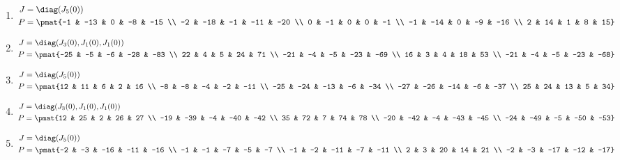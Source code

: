 \begin{enumerate}
\item

\begin{align*}
J &= \diag(J_{5}(0))\\
P &= \pmat{-1 & -13 & 0 & -8 & -15 \\ -2 & -18 & -1 & -11 & -20 \\ 0 & -1 & 0 & 0 & -1 \\ -1 & -14 & 0 & -9 & -16 \\ 2 & 14 & 1 & 8 & 15}
\end{align*}

\item

\begin{align*}
J &= \diag(J_{3}(0), J_{1}(0), J_{1}(0))\\
P &= \pmat{-25 & -5 & -6 & -28 & -83 \\ 22 & 4 & 5 & 24 & 71 \\ -21 & -4 & -5 & -23 & -69 \\ 16 & 3 & 4 & 18 & 53 \\ -21 & -4 & -5 & -23 & -68}
\end{align*}

\item

\begin{align*}
J &= \diag(J_{5}(0))\\
P &= \pmat{12 & 11 & 6 & 2 & 16 \\ -8 & -8 & -4 & -2 & -11 \\ -25 & -24 & -13 & -6 & -34 \\ -27 & -26 & -14 & -6 & -37 \\ 25 & 24 & 13 & 5 & 34}
\end{align*}

\item

\begin{align*}
J &= \diag(J_{3}(0), J_{1}(0), J_{1}(0))\\
P &= \pmat{12 & 25 & 2 & 26 & 27 \\ -19 & -39 & -4 & -40 & -42 \\ 35 & 72 & 7 & 74 & 78 \\ -20 & -42 & -4 & -43 & -45 \\ -24 & -49 & -5 & -50 & -53}
\end{align*}

\item

\begin{align*}
J &= \diag(J_{5}(0))\\
P &= \pmat{-2 & -3 & -16 & -11 & -16 \\ -1 & -1 & -7 & -5 & -7 \\ -1 & -2 & -11 & -7 & -11 \\ 2 & 3 & 20 & 14 & 21 \\ -2 & -3 & -17 & -12 & -17}
\end{align*}


\end{enumerate}
